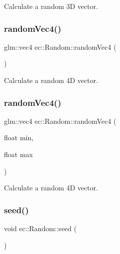 Calculate a random 3D vector. \mbox{\label{classec_1_1_random_a14fae11ffad84de3a030d5f218192bcf}} 
\subsubsection{\texorpdfstring{random\+Vec4()}{randomVec4()}\hspace{0.1cm}{\footnotesize\ttfamily [1/2]}}
{\footnotesize\ttfamily glm\+::vec4 ec\+::\+Random\+::random\+Vec4 (\begin{DoxyParamCaption}{ }\end{DoxyParamCaption})\hspace{0.3cm}{\ttfamily [static]}}

Calculate a random 4D vector. \mbox{\label{classec_1_1_random_aaa2a5ec20d1e3c2b44e75ada89519982}} 
\subsubsection{\texorpdfstring{random\+Vec4()}{randomVec4()}\hspace{0.1cm}{\footnotesize\ttfamily [2/2]}}
{\footnotesize\ttfamily glm\+::vec4 ec\+::\+Random\+::random\+Vec4 (\begin{DoxyParamCaption}\item[{float}]{min,  }\item[{float}]{max }\end{DoxyParamCaption})\hspace{0.3cm}{\ttfamily [static]}}

Calculate a random 4D vector. \mbox{\label{classec_1_1_random_a3e4ad02afb2979b3549fbd70e6f71412}} 
\subsubsection{\texorpdfstring{seed()}{seed()}\hspace{0.1cm}{\footnotesize\ttfamily [1/2]}}
{\footnotesize\ttfamily void ec\+::\+Random\+::seed (\begin{DoxyParamCaption}{ }\end{DoxyParamCaption})\hspace{0.3cm}{\ttfamily [static]}}

